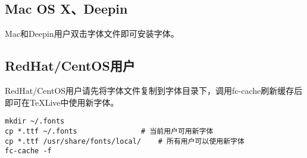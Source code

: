 \subsection{Mac OS X、Deepin}

Mac和Deepin用户双击字体文件即可安装字体。

\subsection{RedHat/CentOS用户}

RedHat/CentOS用户请先将字体文件复制到字体目录下，调用fc-cache刷新缓存后即可在TeXLive中使用新字体。

\begin{lstlisting}[basicstyle=\small\ttfamily, numbers=none]
mkdir ~/.fonts
cp *.ttf ~/.fonts				# 当前用户可用新字体
cp *.ttf /usr/share/fonts/local/	# 所有用户可以使用新字体
fc-cache -f
\end{lstlisting}

